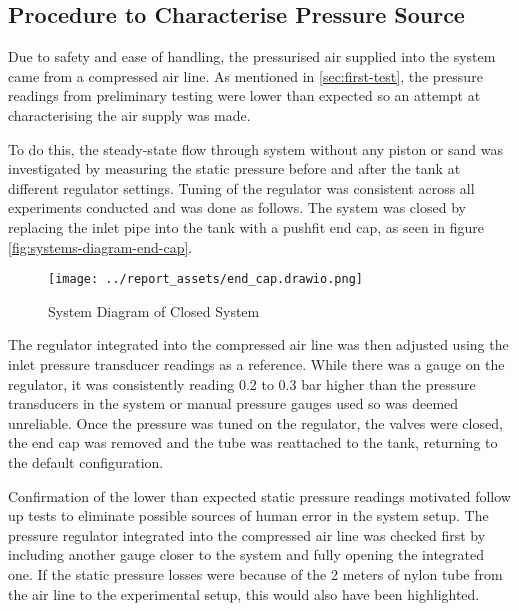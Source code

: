 

\subsection{Procedure to Characterise Pressure Source}\label{sec:pressure-source-procedure}
Due to safety and ease of handling, the pressurised air supplied into the system came from a compressed air line. As mentioned in \autoref{sec:first-test}, the pressure readings from preliminary testing were lower than expected so an attempt at characterising the air supply was made. 

To do this, the steady-state flow through system without any piston or sand was investigated by measuring the static pressure before and after the tank at different regulator settings. Tuning of the regulator was consistent across all experiments conducted and was done as follows. The system was closed by replacing the inlet pipe into the tank with a pushfit end cap, as seen in figure \autoref{fig:systems-diagram-end-cap}.
\begin{figure}[htbp]
    \centering
    \begin{minipage}{0.60\textwidth}
        \centering
        \texttt{[image: ../report\_assets/end\_cap.drawio.png]}
        \caption{System Diagram of Closed System}\label{fig:systems-diagram-end-cap}
    \end{minipage}
\end{figure}
The regulator integrated into the compressed air line was then adjusted using the inlet pressure transducer readings as a reference. While there was a gauge on the regulator, it was consistently reading 0.2 to 0.3 bar higher than the pressure transducers in the system or manual pressure gauges used so was deemed unreliable. Once the pressure was tuned on the regulator, the valves were closed, the end cap was removed and the tube was reattached to the tank, returning to the default configuration. 

Confirmation of the lower than expected static pressure readings motivated follow up tests to eliminate possible sources of human error in the system setup. The pressure regulator integrated into the compressed air line was checked first by including another gauge closer to the system and fully opening the integrated one. If the static pressure losses were because of the 2 meters of nylon tube from the air line to the experimental setup, this would also have been highlighted.

